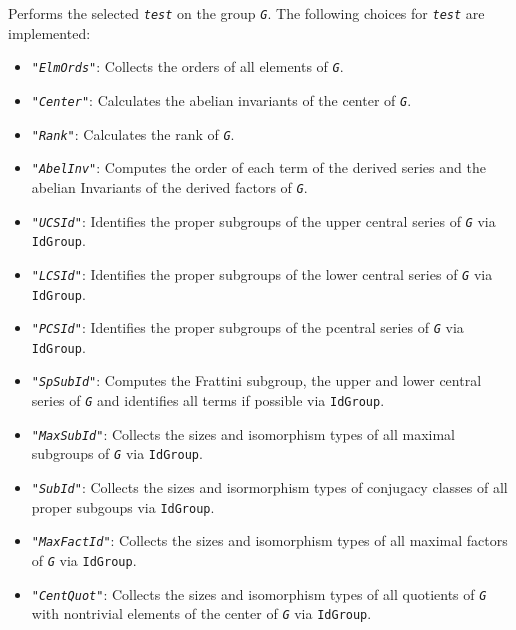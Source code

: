 \documentclass[a4paper,11pt]{report}
\begin{document}
{{{ Performs the selected \mbox{\texttt{\mdseries\slshape test}} on the group \mbox{\texttt{\mdseries\slshape G}}. The following choices for \mbox{\texttt{\mdseries\slshape test}} are implemented: 
\begin{itemize}
\item  \mbox{\texttt{\mdseries\slshape "ElmOrds"}}: Collects the orders of all elements of \mbox{\texttt{\mdseries\slshape G}}. 
\item  \mbox{\texttt{\mdseries\slshape "Center"}}: Calculates the abelian invariants of the center of \mbox{\texttt{\mdseries\slshape G}}. 
\item  \mbox{\texttt{\mdseries\slshape "Rank"}}: Calculates the rank of \mbox{\texttt{\mdseries\slshape G}}. 
\item  \mbox{\texttt{\mdseries\slshape "AbelInv"}}: Computes the order of each term of the derived series and the abelian
Invariants of the derived factors of \mbox{\texttt{\mdseries\slshape G}}. 
\item  \mbox{\texttt{\mdseries\slshape "UCSId"}}: Identifies the proper subgroups of the upper central series of \mbox{\texttt{\mdseries\slshape G}} via \texttt{IdGroup}. 
\item  \mbox{\texttt{\mdseries\slshape "LCSId"}}: Identifies the proper subgroups of the lower central series of \mbox{\texttt{\mdseries\slshape G}} via \texttt{IdGroup}. 
\item  \mbox{\texttt{\mdseries\slshape "PCSId"}}: Identifies the proper subgroups of the p\texttt{}central series
of \mbox{\texttt{\mdseries\slshape G}} via \texttt{IdGroup}. 
\item  \mbox{\texttt{\mdseries\slshape "SpSubId"}}: Computes the Frattini subgroup, the upper and lower central series of \mbox{\texttt{\mdseries\slshape G}} and identifies all terms if possible via \texttt{IdGroup}. 
\item  \mbox{\texttt{\mdseries\slshape "MaxSubId"}}: Collects the sizes and isomorphism types of all maximal subgroups of \mbox{\texttt{\mdseries\slshape G}} via \texttt{IdGroup}. 
\item  \mbox{\texttt{\mdseries\slshape "SubId"}}: Collects the sizes and isormorphism types of conjugacy classes of all proper
subgoups via \texttt{IdGroup}. 
\item  \mbox{\texttt{\mdseries\slshape "MaxFactId"}}: Collects the sizes and isomorphism types of all maximal factors of \mbox{\texttt{\mdseries\slshape G}} via \texttt{IdGroup}. 
\item  \mbox{\texttt{\mdseries\slshape "CentQuot"}}: Collects the sizes and isomorphism types of all quotients of \mbox{\texttt{\mdseries\slshape G}} with non\texttt{}trivial elements of the center of \mbox{\texttt{\mdseries\slshape G}} via \texttt{IdGroup}. 

\end{itemize}}}}
\end{document}
